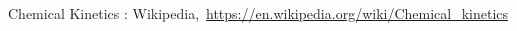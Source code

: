 \cleardoublepage
{}
{}
\begin{thebibliography}{99}

Chemical Kinetics : Wikipedia,\ \url{https://en.wikipedia.org/wiki/Chemical_kinetics}
\end{thebibliography}

